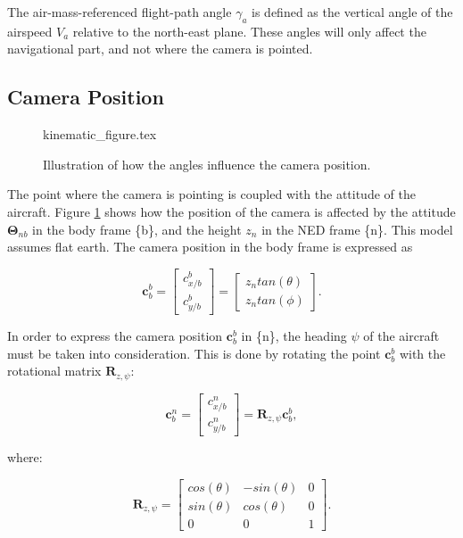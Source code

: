 The air-mass-referenced flight-path angle $\gamma_a$ is defined as the vertical angle of the airspeed $V_a$ relative to the north-east plane. These angles will only affect the navigational part, and not where the camera is pointed.


\subsection{Camera Position}

\begin{figure}
	{kinematic_figure.tex}
	\caption{Illustration of how the angles influence the camera position.}
	\label{fig:camera_kinematics}
\end{figure}
	
The point where the camera is pointing is coupled with the attitude of the aircraft. Figure \ref{fig:camera_kinematics} shows how the position of the camera is affected by the attitude $\bm{\Theta}_{nb}$ in the body frame \{b\}, and the height $z_n$ in the NED frame \{n\}. This model assumes flat earth. The camera position in the body frame is expressed as

\begin{equation} \label{eq:camera_pos}
	\bm{c}_b^b =
	\begin{bmatrix}
		c_{x/b}^b \\
		c_{y/b}^b
	\end{bmatrix}
	=
	\begin{bmatrix}
		z_n tan(\theta) \\
		z_n tan(\phi)
	\end{bmatrix}.
\end{equation}

In order to express the camera position $\bm{c}_b^b$ in \{n\}, the heading $\psi$ of the aircraft must be taken into consideration. This is done by rotating the point $\bm{c}_b^b$ with the rotational matrix $\bm{R}_{z,\psi}$:

\begin{equation} \label{eq:body_ned_rotate}
	\bm{c}_b^n =
	\begin{bmatrix}
		c_{x/b}^n \\
		c_{y/b}^n
	\end{bmatrix}
	= \bm{R}_{z,\psi} \bm{c}_b^b,
\end{equation}

where:

\begin{equation}
	\bm{R}_{z,\psi} = 
	\begin{bmatrix}
		cos(\theta) & -sin(\theta) & 0 \\
		sin(\theta) & cos(\theta) & 0 \\
		0 & 0 & 1
	\end{bmatrix}.
\end{equation}

